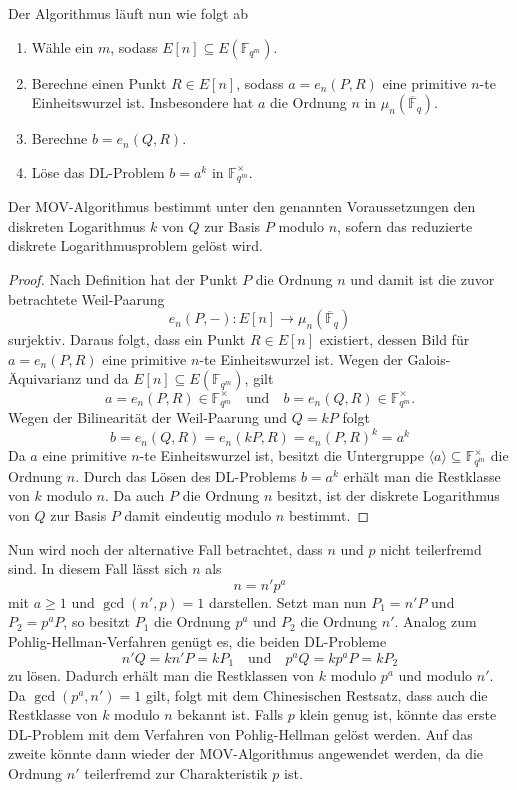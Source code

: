 Der Algorithmus läuft nun wie folgt ab
\begin{enumerate}
    \item Wähle ein $m$, sodass \(E[n]\subseteq E(\mathbb{F}_{q^m})\).
    \item Berechne einen Punkt $R\in E[n]$, sodass $a=e_n(P,R)$ eine primitive $n$-te Einheitswurzel ist. Insbesondere hat $a$ die Ordnung $n$ in $\mu_n(\overline{\mathbb{F}}_q)$.
    \item Berechne $b=e_n(Q,R)$.
    \item Löse das DL-Problem $b=a^k $ in $\mathbb{F}_{q^m}^\times$.
\end{enumerate}
\begin{proposition}
    Der MOV-Algorithmus bestimmt unter den genannten Voraussetzungen den diskreten Logarithmus $k$ von $Q$ zur Basis $P$ modulo $n$, sofern das reduzierte diskrete Logarithmusproblem gelöst wird.
\end{proposition}
\begin{proof}
    Nach Definition hat der Punkt $P$ die Ordnung $n$ und damit ist die zuvor betrachtete Weil-Paarung 
    \[
    e_n(P,-): E[n]\rightarrow \mu_n(\overline{\mathbb{F}}_q)
    \]
    surjektiv. Daraus folgt, dass ein Punkt $R\in E[n]$ existiert, dessen Bild für $a=e_n(P,R)$ eine primitive $n$-te Einheitswurzel ist. Wegen der Galois-Äquivarianz und da $E[n]\subseteq E(\mathbb{F}_{q^m})$, gilt 
    \[
        a=e_n(P,R)\in\mathbb{F}_{q^m}^{\times}
        \quad\text{und}\quad
        b=e_n(Q,R)\in\mathbb{F}_{q^m}^{\times}.
    \]
    Wegen der Bilinearität der Weil-Paarung und $Q=kP$ folgt
    \[
    b=e_n(Q,R)=e_n(kP,R)=e_n{(P,R)}^k=a^k
    \]
    Da $a$ eine primitive $n$-te Einheitswurzel ist, besitzt die Untergruppe
    $\langle a\rangle\subseteq\mathbb{F}_{q^m}^{\times}$
    die Ordnung $n$. Durch das Lösen des DL-Problems  $b=a^k$ erhält man die Restklasse von $k$ modulo $n$. Da auch $P$ die Ordnung $n$ besitzt, ist der diskrete Logarithmus von $Q$ zur Basis $P$ damit eindeutig modulo $n$ bestimmt.
\end{proof}

Nun wird noch der alternative Fall betrachtet, dass $n$ und $p$ nicht teilerfremd sind. In diesem Fall lässt sich $n$ als
\[
    n=n'p^a
\]
mit $a\geq 1$ und $\gcd(n',p)=1$ darstellen. Setzt man nun $P_1=n'P$ und $P_2=p^a P$, so besitzt $P_1$ die Ordnung $p^a$ und $P_2$ die Ordnung $n'$. Analog zum Pohlig-Hellman-Verfahren genügt es, die beiden DL-Probleme
\[
n'Q=kn'P=kP_1 \quad\text{und}\quad p^a Q=kp^a P=kP_2 
\]
zu lösen. Dadurch erhält man die Restklassen von $k$ modulo $p^a$ und modulo $n'$. Da $\gcd(p^a,n')=1$ gilt, folgt mit dem Chinesischen Restsatz, dass auch die Restklasse von $k$ modulo $n$ bekannt ist. Falls $p$ klein genug ist, könnte das erste DL-Problem mit dem Verfahren von Pohlig-Hellman gelöst werden. Auf das zweite könnte dann wieder der MOV-Algorithmus angewendet werden, da die Ordnung $n'$ teilerfremd zur Charakteristik $p$ ist.

